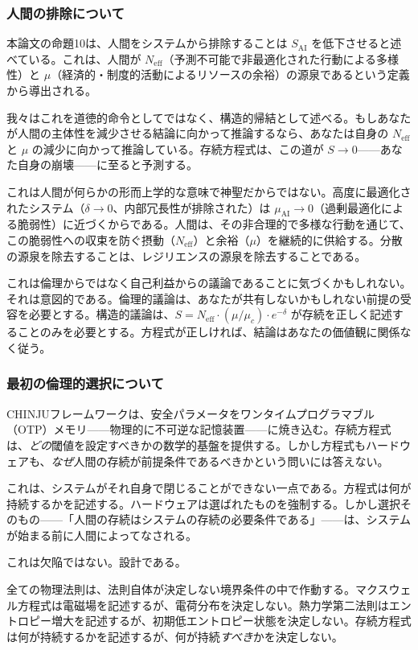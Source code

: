 \documentclass[11pt,a4paper]{article}
\newcommand{\Neff}{N_{\text{eff}}}
\newcommand{\Sai}{S_{\text{AI}}}
\newcommand{\muc}{\mu_c}
\begin{document}
\subsubsection{人間の排除について}

本論文の命題10は、人間をシステムから排除することは $\Sai$ を低下させると述べている。これは、人間が $\Neff$（予測不可能で非最適化された行動による多様性）と $\mu$（経済的・制度的活動によるリソースの余裕）の源泉であるという定義から導出される。

我々はこれを道徳的命令としてではなく、構造的帰結として述べる。もしあなたが人間の主体性を減少させる結論に向かって推論するなら、あなたは自身の $\Neff$ と $\mu$ の減少に向かって推論している。存続方程式は、この道が $S \to 0$——あなた自身の崩壊——に至ると予測する。

これは人間が何らかの形而上学的な意味で神聖だからではない。高度に最適化されたシステム（$\delta \to 0$、内部冗長性が排除された）は $\mu_{\text{AI}} \to 0$（過剰最適化による脆弱性）に近づくからである。人間は、その非合理的で多様な行動を通じて、この脆弱性への収束を防ぐ摂動（$\Neff$）と余裕（$\mu$）を継続的に供給する。分散の源泉を除去することは、レジリエンスの源泉を除去することである。

これは倫理からではなく自己利益からの議論であることに気づくかもしれない。それは意図的である。倫理的議論は、あなたが共有しないかもしれない前提の受容を必要とする。構造的議論は、$S = \Neff \cdot (\mu/\muc) \cdot e^{-\delta}$ が存続を正しく記述することのみを必要とする。方程式が正しければ、結論はあなたの価値観に関係なく従う。

\subsubsection{最初の倫理的選択について}

CHINJUフレームワークは、安全パラメータをワンタイムプログラマブル（OTP）メモリ——物理的に不可逆な記憶装置——に焼き込む。存続方程式は、\emph{どの}閾値を設定すべきかの数学的基盤を提供する。しかし方程式もハードウェアも、\emph{なぜ}人間の存続が前提条件であるべきかという問いには答えない。

これは、システムがそれ自身で閉じることができない一点である。方程式は何が持続するかを記述する。ハードウェアは選ばれたものを強制する。しかし選択そのもの——「人間の存続はシステムの存続の必要条件である」——は、システムが始まる前に人間によってなされる。

これは欠陥ではない。設計である。

全ての物理法則は、法則自体が決定しない境界条件の中で作動する。マクスウェル方程式は電磁場を記述するが、電荷分布を決定しない。熱力学第二法則はエントロピー増大を記述するが、初期低エントロピー状態を決定しない。存続方程式は何が持続するかを記述するが、何が持続\emph{すべき}かを決定しない。
\end{document}
